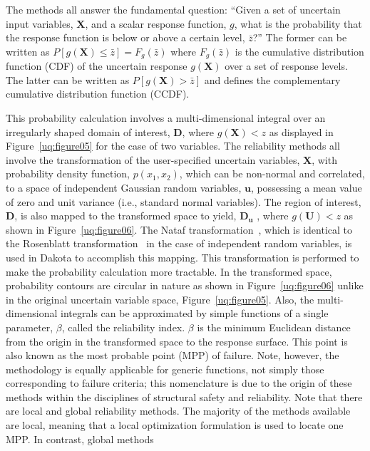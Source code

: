The methods all answer the fundamental question: ``Given a set of
uncertain input variables, $\mathbf{X}$, and a scalar response
function, $g$, what is the probability that the response function is
below or above a certain level, $\bar{z}$?'' The former can be written
as $P[g(\mathbf{X}) \le \bar{z}] = \mathit{F}_{g}(\bar{z})$ where
$\mathit{F}_{g}(\bar{z})$ is the cumulative distribution function
(CDF) of the uncertain response $g(\mathbf{X})$ over a set of response
levels. The latter can be written as $P[g(\mathbf{X}) > \bar{z}]$ and
defines the complementary cumulative distribution function (CCDF).

This probability calculation involves a multi-dimensional integral
over an irregularly shaped domain of interest, $\mathbf{D}$, where
$g(\mathbf{X}) < z$ as displayed in Figure~\ref{uq:figure05} for the
case of two variables. The reliability methods all involve the
transformation of the user-specified uncertain variables,
$\mathbf{X}$, with probability density function, $p(x_1,x_2)$, which
can be non-normal and correlated, to a space of independent Gaussian
random variables, $\mathbf{u}$, possessing a mean value of zero and
unit variance (i.e., standard normal variables). The region of
interest, $\mathbf{D}$, is also mapped to the transformed space to
yield, $\mathbf{D_{u}}$ , where $g(\mathbf{U}) < z$ as shown in
Figure~\ref{uq:figure06}. The Nataf transformation~\cite{Der86},
which is identical to the Rosenblatt transformation~\cite{Ros52} in
the case of independent random variables, is used in Dakota to
accomplish this mapping. This transformation is performed to make the
probability calculation more tractable. In the transformed space,
probability contours are circular in nature as shown in
Figure~\ref{uq:figure06} unlike in the original uncertain variable
space, Figure~\ref{uq:figure05}. Also, the multi-dimensional integrals
can be approximated by simple functions of a single parameter,
$\beta$, called the reliability index. $\beta$ is the minimum
Euclidean distance from the origin in the transformed space to the
response surface. This point is also known as the most probable point
(MPP) of failure. Note, however, the methodology is equally applicable
for generic functions, not simply those corresponding to failure
criteria; this nomenclature is due to the origin of these methods
within the disciplines of structural safety and reliability.
Note that there are local and global reliability methods. The majority 
of the methods available are local, meaning that a local optimization 
formulation is used to locate one MPP. In contrast, global methods
